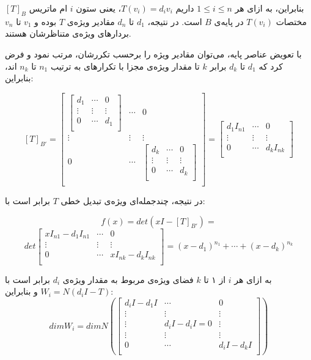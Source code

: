 بنابراین، به ازای هر $1\leq i \leq n$ داریم
$T(v_i)=d_iv_i$،
یعنی ستون $i$ ام ماتریس $[T]_B$ مختصات $T(v_i)$ در پایه‌ی $B$ است. در نتیجه، $d_1$ تا $d_n$ مقادیر ویژه‌ی $T$ بوده و  $v_1$ تا $v_n$ بردارهای ویژه‌ی متناظرشان هستند.

با تعویض عناصر پایه، می‌توان مقادیر ویژه را برحسب تکررشان، مرتب نمود و فرض کرد که $d_1$ تا $d_k$ برابر $k$ تا مقدار ویژه‌ی مجزا با تکرارهای به ترتیب $n_1$ تا $n_k$ اند، بنابراین:‌

$$[T]_{B'} = \begin{bmatrix}
{\begin{bmatrix}
d_1 & \cdots & 0 \\
\vdots & \vdots & \vdots \\
0 & \cdots & d_1 \\
\end{bmatrix}} & \cdots & 0 \\
\vdots & \vdots & \vdots \\
0 & \cdots & {\begin{bmatrix}
	d_k & \cdots & 0 \\
	\vdots & \vdots & \vdots \\
	0 & \cdots & d_k \\
	\end{bmatrix}} \\
\end{bmatrix} =
\begin{bmatrix}
d_1I_{n1} & \cdots & 0 \\
\vdots & \vdots & \vdots \\
0 & \cdots & d_kI_{nk} \\
\end{bmatrix}$$

در نتیجه، چندجمله‌ای ویژه‌ی تبدیل خطی $T$ برابر است با:

$$ f(x)=det(xI-[T]_{B'}) = $$
$$ det \begin{bmatrix}
xI_{n1}-d_1I_{n1} & \cdots & 0 \\
\vdots & \vdots & \vdots \\
0 & \cdots & xI_{nk}-d_kI_{nk} \\
\end{bmatrix} = (x-d_1)^{n_1} + \cdots + (x-d_k)^{n_k} $$

به ازای هر $i$ از ۱ تا $k$ فضای ویژه‌ی مربوط به مقدار ویژه‌ی $d_i$ برابر است با
$W_i = N(d_iI-T)$
و بنابراین:
$$dimW_i = dimN(\begin{bmatrix}
d_iI-d_1I & \cdots & 0 \\
\vdots & \vdots & \vdots \\
\vdots & d_iI-d_iI=0 & \vdots \\
\vdots & \vdots & \vdots \\
0 & \cdots & d_iI-d_kI \\
\end{bmatrix})$$

